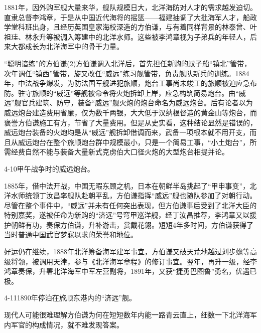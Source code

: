\documentclass[12pt,UTF8]{ctexbook}
\begin{document}
1881年，因外购军舰大量来华，舰队规模日大，北洋海防对人才的需求越发迫切。直隶总督李鸿章，于是从中国近代海将的摇篮——福建抽调了大批海军人才，船政学堂科班出身，且经历英国皇家海校深造的方伯谦，与有着同样背景的林泰曾、叶祖珪、林永升等被调入筹建中的北洋水师。这些被李鸿章视为子弟兵的年轻人，后来大都成长为北洋海军中的骨干力量。

“聪明谙练”的方伯谦(2)方伯谦调入北洋后，首先担任新购的蚊子船“镇北”管带，次年调任“镇西”管带，旋又改任“威远”练习舰管带，负责舰队新兵的训练。1884年，中法战争爆发，为防法国军舰进犯旅顺，炮台工事尚未竣工的旅顺被迫应急布防。驻守旅顺的“威远”等舰被命令将火炮拆卸上岸，应急构筑简易炮台。由“威远”舰官兵建筑、防守，装备“威远”舰火炮的炮台命名为威远炮台。后有论者以为威远炮台建造费用省廉，仅为数千两银，大大低于汉纳根督造的黄金山等炮台，而褒誉方伯谦施工有方，节省了大量费用。但是从史实看，这种结论显然是错误的，威远炮台装备的火炮均是从“威远”舰拆卸借调而来，武备一项根本就不用开支，而且从威远炮台在整个旅顺炮台群中规模最小，只是一个简易工事，“小土炮台”，所需经费自然不能与装备大量新式克虏伯大口径火炮的大型炮台相提并论。

4-10甲午战争时的威远炮台。

1885年，借中法开战，中国无暇东顾之机，日本在朝鲜半岛挑起了“甲申事变”，北洋水师统领丁汝昌率舰队赴朝平乱，方伯谦指挥“威远”舰也随队参加了对朝行动。尽管在整个事件中，“威远”并未有任何突出表现，但方伯谦事后受到了北洋大臣的特别嘉奖，遂被任命为新购的“济远”号穹甲巡洋舰，经丁汝昌推荐，李鸿章又以援护朝鲜有功，奏保方伯谦，升补游击，赏戴花翎。短短4年多时间，方伯谦获得了当时普通中国武官梦寐以求的荣誉和地位。

好运仍在继续，1888年北洋筹备海军建军事宜，方伯谦又破天荒地越过刘步蟾等高级将领，被调用天津，参与《北洋海军章程》的修订事宜。翌年，再升一级，经李鸿章奏保，升署北洋海军中军左营副将，1891年，又获“捷勇巴图鲁”勇名，优遇已极。

4-111890年停泊在旅顺东港内的“济远”舰。

现代人可能很难理解方伯谦为何在短短数年内能一路青云直上，细数一下北洋海军内军官的构成情况，就不难发现答案。
\end{document}

